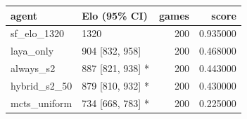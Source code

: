 \begin{tabular}{llrr}
\toprule
agent & Elo (95\% CI) & games & score \\
\midrule
sf\_elo\_1320 & 1320 & 200 & 0.935000 \\
laya\_only & 904 [832, 958] & 200 & 0.468000 \\
always\_s2 & 887 [821, 938] * & 200 & 0.443000 \\
hybrid\_s2\_50 & 879 [810, 932] * & 200 & 0.430000 \\
mcts\_uniform & 734 [668, 783] * & 200 & 0.225000 \\
\bottomrule
\end{tabular}
